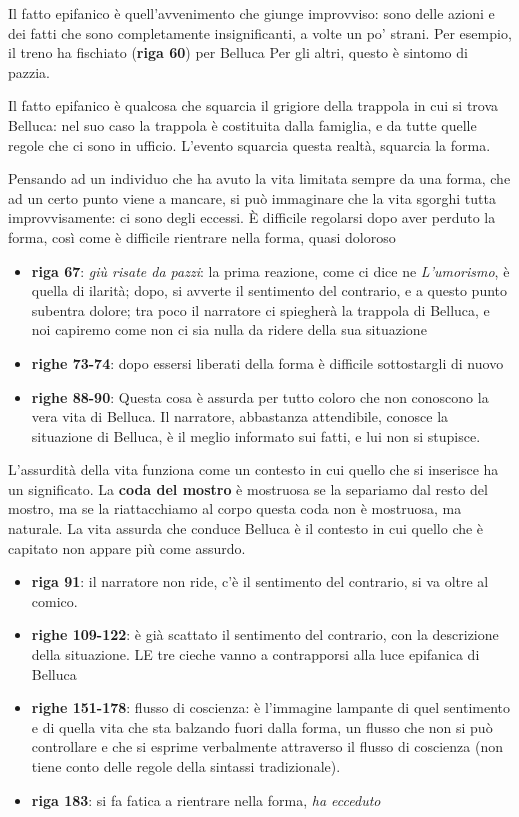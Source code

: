 \documentclass[a4paper, twoside, titlepage]{book}
\newcommand{\elenco}[1]{%
\begin{itemize}
#1
\end{itemize}}
\begin{document}
Il fatto epifanico è quell'avvenimento che giunge improvviso: sono delle azioni e dei fatti che sono completamente insignificanti, a volte un po' strani. Per esempio, il treno ha fischiato (\textbf{riga 60}) per Belluca
Per gli altri, questo è sintomo di pazzia.

Il fatto epifanico è qualcosa che squarcia il grigiore della trappola in cui si trova Belluca: nel suo caso la trappola è costituita dalla famiglia, e da tutte quelle regole che ci sono in ufficio. L'evento squarcia questa realtà, squarcia la forma.

Pensando ad un individuo che ha avuto la vita limitata sempre da una forma, che ad un certo punto viene a mancare, si può immaginare che la vita sgorghi tutta improvvisamente: ci sono degli eccessi.
È difficile regolarsi dopo aver perduto la forma, così come è difficile rientrare nella forma, quasi doloroso

\elenco{\item \textbf{riga 67}: \textit{giù risate da pazzi}: la prima reazione, come ci dice ne \textit{L'umorismo}, è quella di ilarità; dopo, si avverte il sentimento del contrario, e a questo punto subentra dolore; tra poco il narratore ci spiegherà la trappola di Belluca, e noi capiremo come non ci sia nulla da ridere della sua situazione
\item \textbf{righe 73-74}: dopo essersi liberati della forma è difficile sottostargli di nuovo
\item \textbf{righe 88-90}: Questa cosa è assurda per tutto coloro che non conoscono la vera vita di Belluca. Il narratore, abbastanza attendibile, conosce la situazione di Belluca, è il meglio informato sui fatti, e lui non si stupisce.
}

L'assurdità della vita funziona come un contesto in cui quello che si inserisce ha un significato.
La \textbf{coda del mostro} è mostruosa se la separiamo dal resto del mostro, ma se la riattacchiamo al corpo questa coda non è mostruosa, ma naturale.
La vita assurda che conduce Belluca è il contesto in cui quello che è capitato non appare più come assurdo.

\elenco{\item \textbf{riga 91}: il narratore non ride, c'è il sentimento del contrario, si va oltre al comico.
\item \textbf{righe 109-122}: è già scattato il sentimento del contrario, con la descrizione della situazione. LE tre cieche vanno a contrapporsi alla luce epifanica di Belluca
\item \textbf{righe 151-178}: flusso di coscienza: è l'immagine lampante di quel sentimento e di quella vita che sta balzando fuori dalla forma, un flusso che non si può controllare e che si esprime verbalmente attraverso il flusso di coscienza (non tiene conto delle regole della sintassi tradizionale).
\item \textbf{riga 183}: si fa fatica a rientrare nella forma, \textit{ha ecceduto}
}
\end{document}
